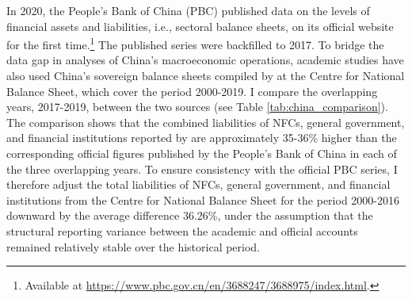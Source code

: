 In 2020, the People’s Bank of China (PBC) published data on the levels of financial assets and liabilities, i.e., sectoral balance sheets, on its official website for the first time.\footnote{Available at \url{https://www.pbc.gov.cn/en/3688247/3688975/index.html}.} The published series were backfilled to 2017. To bridge the data gap in analyses of China’s macroeconomic operations, academic studies have also used China’s sovereign balance sheets compiled by \textcite{li_yang_chinas_2020} at the Centre for National Balance Sheet, which cover the period 2000-2019.
I compare the overlapping years, 2017-2019, between the two sources (see Table \ref{tab:china_comparison}). The comparison shows that the combined liabilities of NFCs, general government, and financial institutions reported by \textcite{li_yang_chinas_2020} are approximately 35-36\% higher than the corresponding official figures published by the People’s Bank of China in each of the three overlapping years. To ensure consistency with the official PBC series, I therefore adjust the total liabilities of NFCs, general government, and financial institutions from the Centre for National Balance Sheet for the period 2000-2016 downward by the average difference 36.26\%, under the assumption that the structural reporting variance between the academic and official accounts remained relatively stable over the historical period.

